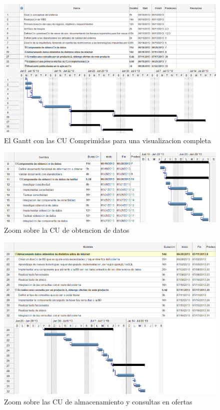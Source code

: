 \begin{landscape}

\begin{figure}[H]
\centering
\includegraphics[scale=\escaladefault]{graficos/gantt/gantt.png}
\caption{El Gantt con las CU Comprimidas para una visualizacion completa}
\end{figure}

\begin{figure}[H]
\centering
\includegraphics[scale=\escaladefault]{graficos/gantt/subgantt1.png}
\caption{Zoom sobre la CU de obtencion de datos}
\end{figure}

\begin{figure}[H]
\centering
\includegraphics[scale=\escaladefault]{graficos/gantt/subgantt2.png}
\caption{Zoom sobre las CU de almacenamiento y consultas en ofertas}
\end{figure}


\end{landscape}

